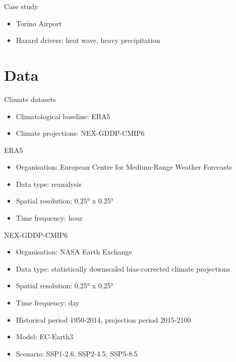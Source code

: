 \documentclass[aspectratio=43]{beamer}
\begin{document}
\begin{frame}{Case study}
  \begin{itemize}
    \item<1-> Torino Airport
    \item<2-> Hazard drivers: heat wave, heavy precipitation
  \end{itemize}
\end{frame}



\section{Data}
\begin{frame}{Climate datasets}
  \begin{itemize}
    \item Climatological baseline: ERA5
    \item Climate projections: NEX-GDDP-CMIP6
  \end{itemize}
\end{frame}

\begin{frame}{ERA5}
  \begin{itemize}
    \item Organisation: European Centre for Medium-Range Weather Forecasts
    \item Data type: reanalysis
    \item Spatial resolution: 0.25° x 0.25°
    \item Time frequency: hour
  \end{itemize}
\end{frame}

\begin{frame}{NEX-GDDP-CMIP6}
  \begin{itemize}
    \item Organisation: NASA Earth Exchange
    \item Data type: statistically downscaled bias-corrected climate projections
    \item Spatial resolution: 0.25° x 0.25°
    \item Time frequency: day
    \item Historical period 1950-2014, projection period 2015-2100
    \item Model: EC-Earth3
    \item Scenario: SSP1-2.6, SSP2-4.5, SSP5-8.5
  \end{itemize}
\end{frame}
\end{document}
